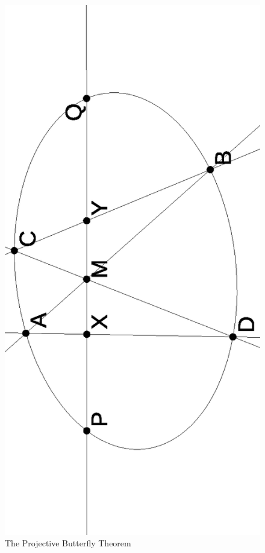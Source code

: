 \begin{figure}[!htb]
\centering
\includegraphics[scale=.5,angle=270]{butterfly.eps}
\caption{The Projective Butterfly Theorem}
\end{figure}

